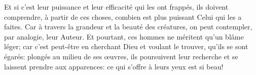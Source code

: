 Et si c’est leur puissance et leur efficacité qui les ont frappés,
	ils doivent comprendre, à partir de ces choses,
	combien est plus puissant Celui qui les a faites.
Car à travers la grandeur et la beauté des créatures,
	on peut contempler, par analogie, leur Auteur.
Et pourtant, ces hommes ne méritent qu’un blâme léger;
	car c’est peut-être en cherchant Dieu et voulant le trouver, qu’ils se sont égarés:
	plongés au milieu de ses œuvres,
	ils poursuivent leur recherche et se laissent prendre aux apparences:
	ce qui s’offre à leurs yeux est si beau!
